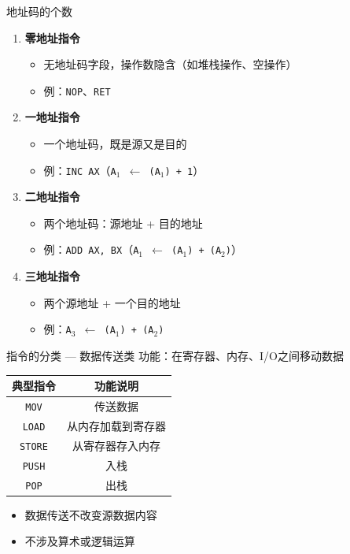 \documentclass[10pt, aspectratio=169]{beamer}
\begin{document}
\begin{frame}{地址码的个数}
    \begin{enumerate}
        \item \textbf{零地址指令}
            \begin{itemize}
                \item 无地址码字段，操作数隐含（如堆栈操作、空操作）
                \item 例：\texttt{NOP}、\texttt{RET}
            \end{itemize}
        \item \textbf{一地址指令}
            \begin{itemize}
                \item 一个地址码，既是源又是目的
                \item 例：\texttt{INC AX}（\texttt{A$_1$ $\leftarrow$ (A$_1$) + 1}）
            \end{itemize}
        \item \textbf{二地址指令}
            \begin{itemize}
                \item 两个地址码：源地址 + 目的地址
                \item 例：\texttt{ADD AX, BX}（\texttt{A$_1$ $\leftarrow$ (A$_1$) + (A$_2$)}）
            \end{itemize}
        \item \textbf{三地址指令}
            \begin{itemize}
                \item 两个源地址 + 一个目的地址
                \item 例：\texttt{A$_3$ $\leftarrow$ (A$_1$) + (A$_2$)}
            \end{itemize}
    \end{enumerate}
\end{frame}

\begin{frame}{指令的分类 --- 数据传送类}
    功能：在寄存器、内存、I/O之间移动数据
    \vspace{0.3em}
    \begin{tabular}{|c|c|}
        \hline
        \textbf{典型指令} & \textbf{功能说明} \\
        \hline
        \texttt{MOV}   & 传送数据 \\
        \texttt{LOAD}  & 从内存加载到寄存器 \\
        \texttt{STORE} & 从寄存器存入内存 \\
        \texttt{PUSH}  & 入栈 \\
        \texttt{POP}   & 出栈 \\
        \hline
    \end{tabular}
    \vspace{0.5em}
    \begin{itemize}
        \item 数据传送不改变源数据内容
        \item 不涉及算术或逻辑运算
    \end{itemize}
\end{frame}
\end{document}
